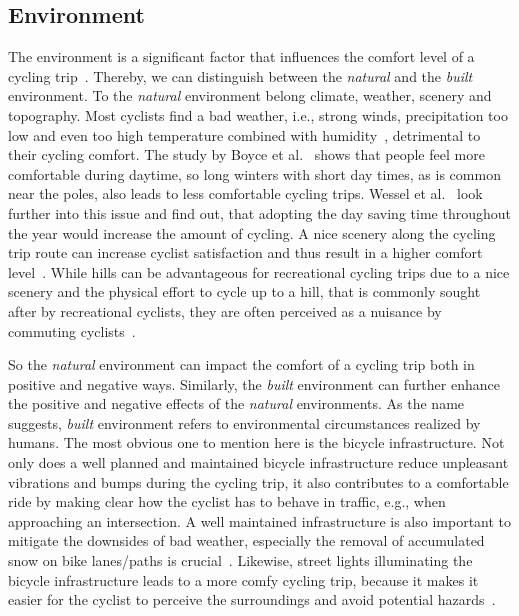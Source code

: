 \subsection*{Environment}
The environment is a significant factor that influences the comfort level of a cycling trip~\cite{hull2014bicycle}.
Thereby, we can distinguish between the \textit{natural} and the \textit{built} environment.
To the \textit{natural} environment belong climate, weather, scenery and topography.
Most cyclists find a bad weather, i.e., strong winds, precipitation too low and even too high temperature combined with humidity~\cite{nkurunziza2012examining}, detrimental to their cycling comfort.
The study by Boyce et al.~\cite{boyce2000perceptions} shows that people feel more comfortable during daytime, so long winters with short day times, as is common near the poles, also leads to less comfortable cycling trips.
Wessel et al.~\cite{wessel2022cycling} look further into this issue and find out, that adopting the day saving time throughout the year would increase the amount of cycling.
A nice scenery along the cycling trip route can increase cyclist satisfaction and thus result in a higher comfort level~\cite{wahlgren2012exploring,willis2013uniquely}.
While hills can be advantageous for recreational cycling trips due to a nice scenery and the physical effort to cycle up to a hill, that is commonly sought after by recreational cyclists, they are often perceived as a nuisance by commuting cyclists~\cite{lee2008neighbourhood}.

So the \textit{natural} environment can impact the comfort of a cycling trip both in positive and negative ways.
Similarly, the \textit{built} environment can further enhance the positive and negative effects of the \textit{natural} environments.
As the name suggests, \textit{built} environment refers to environmental circumstances realized by humans.
The most obvious one to mention here is the bicycle infrastructure.
Not only does a well planned and maintained bicycle infrastructure reduce unpleasant vibrations and bumps during the cycling trip, it also contributes to a comfortable ride by making clear how the cyclist has to behave in traffic, e.g., when approaching an intersection.
A well maintained infrastructure is also important to mitigate the downsides of bad weather, especially the removal of accumulated snow on bike lanes/paths is crucial~\cite{an2019weather,shoman2023evaluation}.
Likewise, street lights illuminating the bicycle infrastructure leads to a more comfy cycling trip, because it makes it easier for the cyclist to perceive the surroundings and avoid potential hazards~\cite{digioia2017safety}.


